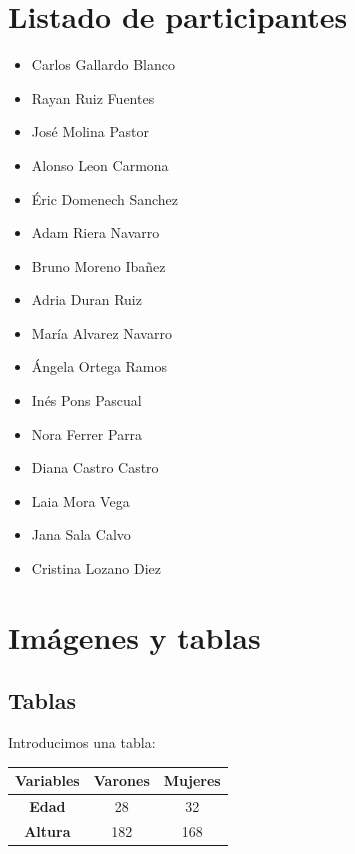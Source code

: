 \documentclass[a4paper,11pt]{article}
\begin{document}
\section{Listado de participantes}

\begin{minipage}{0.5\linewidth}
	\begin{itemize}
		\item Carlos Gallardo Blanco
		\item Rayan Ruiz Fuentes
		\item José Molina Pastor
		\item Alonso Leon Carmona
		\item Éric Domenech Sanchez
		\item Adam Riera Navarro
		\item Bruno Moreno Ibañez
		\item Adria Duran Ruiz
	\end{itemize}
\end{minipage}
\begin{minipage}{0.5\linewidth}
	\begin{itemize}
		\item María Alvarez Navarro
		\item Ángela Ortega Ramos
		\item Inés Pons Pascual
		\item Nora Ferrer Parra
		\item Diana Castro Castro
		\item Laia Mora Vega
		\item Jana Sala Calvo
		\item Cristina Lozano Diez
	\end{itemize}
\end{minipage}

\newpage

\section{Imágenes y tablas}

\subsection{Tablas}

Introducimos una tabla:\\

\begin{center}
	\begin{tabular}{|c|c|c|}
		\hline
		\rowcolor[HTML]{C0C0C0} 
		\textbf{Variables} & \textbf{Varones} & \textbf{Mujeres} \\ \hline
		\textbf{Edad}      & 28               & 32               \\ \hline
		\textbf{Altura}    & 182              & 168              \\ \hline
	\end{tabular}
\end{center}
\end{document}
